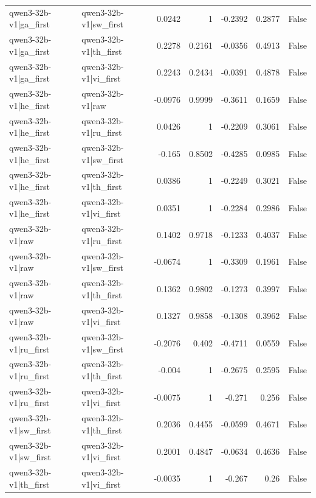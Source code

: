 \begin{table}
\begin{tabular}{l l r r r r l}
qwen3-32b-v1|ga_first & qwen3-32b-v1|sw_first & 0.0242 & 1 & -0.2392 & 0.2877 & False \\
qwen3-32b-v1|ga_first & qwen3-32b-v1|th_first & 0.2278 & 0.2161 & -0.0356 & 0.4913 & False \\
qwen3-32b-v1|ga_first & qwen3-32b-v1|vi_first & 0.2243 & 0.2434 & -0.0391 & 0.4878 & False \\
qwen3-32b-v1|he_first & qwen3-32b-v1|raw & -0.0976 & 0.9999 & -0.3611 & 0.1659 & False \\
qwen3-32b-v1|he_first & qwen3-32b-v1|ru_first & 0.0426 & 1 & -0.2209 & 0.3061 & False \\
qwen3-32b-v1|he_first & qwen3-32b-v1|sw_first & -0.165 & 0.8502 & -0.4285 & 0.0985 & False \\
qwen3-32b-v1|he_first & qwen3-32b-v1|th_first & 0.0386 & 1 & -0.2249 & 0.3021 & False \\
qwen3-32b-v1|he_first & qwen3-32b-v1|vi_first & 0.0351 & 1 & -0.2284 & 0.2986 & False \\
qwen3-32b-v1|raw & qwen3-32b-v1|ru_first & 0.1402 & 0.9718 & -0.1233 & 0.4037 & False \\
qwen3-32b-v1|raw & qwen3-32b-v1|sw_first & -0.0674 & 1 & -0.3309 & 0.1961 & False \\
qwen3-32b-v1|raw & qwen3-32b-v1|th_first & 0.1362 & 0.9802 & -0.1273 & 0.3997 & False \\
qwen3-32b-v1|raw & qwen3-32b-v1|vi_first & 0.1327 & 0.9858 & -0.1308 & 0.3962 & False \\
qwen3-32b-v1|ru_first & qwen3-32b-v1|sw_first & -0.2076 & 0.402 & -0.4711 & 0.0559 & False \\
qwen3-32b-v1|ru_first & qwen3-32b-v1|th_first & -0.004 & 1 & -0.2675 & 0.2595 & False \\
qwen3-32b-v1|ru_first & qwen3-32b-v1|vi_first & -0.0075 & 1 & -0.271 & 0.256 & False \\
qwen3-32b-v1|sw_first & qwen3-32b-v1|th_first & 0.2036 & 0.4455 & -0.0599 & 0.4671 & False \\
qwen3-32b-v1|sw_first & qwen3-32b-v1|vi_first & 0.2001 & 0.4847 & -0.0634 & 0.4636 & False \\
qwen3-32b-v1|th_first & qwen3-32b-v1|vi_first & -0.0035 & 1 & -0.267 & 0.26 & False \\
\bottomrule
\end{tabular}
\end{table}
